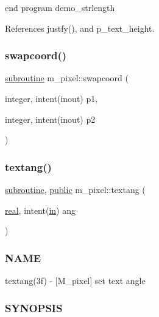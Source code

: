 end program demo\+\_\+strlength 

References justfy(), and p\+\_\+text\+\_\+height.

\mbox{\label{namespacem__pixel_a063f74c3dd2f7f086dc47ec68abc22c9}} 
\subsubsection{\texorpdfstring{swapcoord()}{swapcoord()}}
{\footnotesize\ttfamily \hyperlink{M__stopwatch_83_8txt_acfbcff50169d691ff02d4a123ed70482}{subroutine} m\+\_\+pixel\+::swapcoord (\begin{DoxyParamCaption}\item[{integer, intent(inout)}]{p1,  }\item[{integer, intent(inout)}]{p2 }\end{DoxyParamCaption})\hspace{0.3cm}{\ttfamily [private]}}

\mbox{\label{namespacem__pixel_a5e213461e9894b99c9e8f278d5c4a858}} 
\subsubsection{\texorpdfstring{textang()}{textang()}}
{\footnotesize\ttfamily \hyperlink{M__stopwatch_83_8txt_acfbcff50169d691ff02d4a123ed70482}{subroutine}, \hyperlink{M__stopwatch_83_8txt_a2f74811300c361e53b430611a7d1769f}{public} m\+\_\+pixel\+::textang (\begin{DoxyParamCaption}\item[{\hyperlink{read__watch_83_8txt_abdb62bde002f38ef75f810d3a905a823}{real}, intent(\hyperlink{M__journal_83_8txt_afce72651d1eed785a2132bee863b2f38}{in})}]{ang }\end{DoxyParamCaption})}



\subsubsection*{N\+A\+ME}

textang(3f) -\/ \mbox{[}M\+\_\+pixel\mbox{]} set text angle 

\subsubsection*{S\+Y\+N\+O\+P\+S\+IS}

